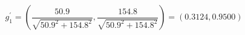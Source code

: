 

\[
g_{1}^{'} = \left( \frac{50.9}{\sqrt{50.9^2 + 154.8^2}}, \frac{154.8}{\sqrt{50.9^2 + 154.8^2}} \right) = (0.3124, 0.9500)
\]


